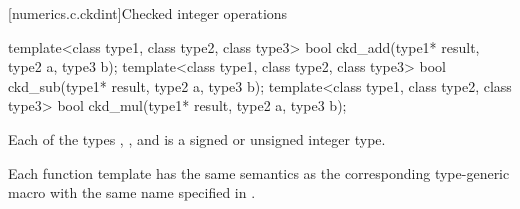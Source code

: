 \pnum
{}

[numerics.c.ckdint]{Checked integer operations}

%
%
%
\begin{itemdecl}
template<class type1, class type2, class type3>
  bool ckd_add(type1* result, type2 a, type3 b);
template<class type1, class type2, class type3>
  bool ckd_sub(type1* result, type2 a, type3 b);
template<class type1, class type2, class type3>
  bool ckd_mul(type1* result, type2 a, type3 b);
\end{itemdecl}

\begin{itemdescr}
\pnum
\mandates
Each of the types , , and  is a
signed or unsigned integer type.

\pnum
\remarks
Each function template has the same semantics as
the corresponding type-generic macro with the same name
specified in .
\end{itemdescr}
